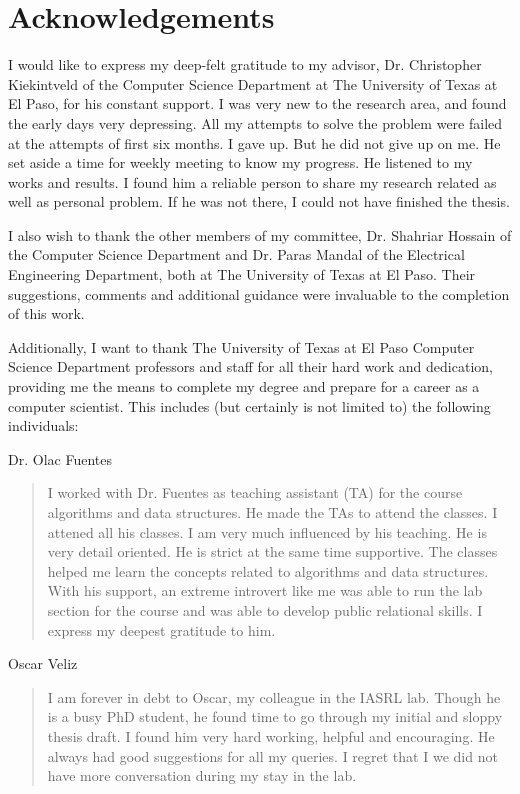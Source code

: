 

\chapter*{Acknowledgements}

I would like to express my deep-felt gratitude to my advisor, Dr. Christopher Kiekintveld of the Computer Science Department at The University of Texas at El
Paso, for his constant support. I was very new to the research area, and found the early days very depressing. All my attempts to solve the problem were failed at the attempts of first six months. I gave up. But he did not give up on me. He set aside a time for weekly meeting to know my progress. He listened to my works and results. I found him a reliable person to share my research related as well as personal problem. If he was not there, I could not have finished the thesis. 

I also wish to thank the other members of my committee, Dr. Shahriar Hossain of 
the Computer Science Department and Dr. Paras Mandal of the Electrical Engineering 
Department, both at The University of Texas at El Paso.  Their suggestions, 
comments and additional guidance were invaluable to the completion of this work.

\newpage
Additionally, I want to thank The University of Texas at El Paso Computer 
Science Department professors and staff for all their hard work and dedication,
providing me the means to complete my degree and prepare for a career as a 
computer scientist. This includes (but certainly is not limited to) the 
following individuals:

\bigskip

\noindent
Dr. Olac Fuentes
\begin{quote}
 I worked with Dr. Fuentes as teaching assistant (TA) for the course algorithms and data structures. He made the TAs to attend the classes. I attened all his classes. I am very much influenced by his teaching. He is very detail oriented. He is strict at the same time supportive. The classes helped me learn the concepts related to algorithms and data structures. With his support, an extreme introvert like me was able to run the lab section for the course and was able to develop public relational skills. I express my deepest gratitude to him.
\end{quote}

\noindent
Oscar Veliz
\begin{quote}
  I am forever in debt to Oscar, my colleague in the IASRL lab. Though he is a busy PhD student, he found time to go through my initial and sloppy thesis draft. I found him very hard working, helpful and encouraging. He always had good suggestions for all my queries. I regret that I we did not have more conversation during my stay in the lab.
\end{quote}

